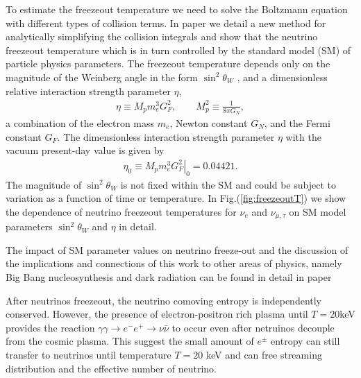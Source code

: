 \documentclass[Universe,article,submit,moreauthors,pdftex]{Definitions/mdpi}
\begin{document}
 To estimate the freezeout temperature we need to solve the Boltzmann equation with different types of collision terms. In paper\cite{Birrell:2014uka} we detail a new method for analytically simplifying the collision integrals and show that the neutrino freezeout temperature which is in turn controlled by the standard model (SM) of particle physics  parameters. The freezeout temperature depends only on the magnitude of the Weinberg angle in the form $\sin^2\theta_W$ , and a dimensionless relative interaction strength parameter $\eta$,
\begin{align}
\eta\equiv M_p m_e^3 G_F^2, \qquad M_p^2\equiv \frac{1}{8\pi G_N}, \end{align}
a combination of  the electron mass $m_e$, Newton constant $G_N$, and the Fermi constant $G_F$. The dimensionless interaction strength parameter $\eta$ with the vacuum present-day value is given by
\begin{align}
\eta_0\equiv \left.M_p m_e^3 G_F^2\right|_0  = 0.04421 .
\end{align}
The magnitude of  $\sin^2\theta_W$ is not fixed within the SM and  could be subject to variation as a function of time or temperature. In Fig.(\ref{fig:freezeoutT}) we show the dependence of neutrino freezeout temperatures for $\nu_e$ and $\nu_{\mu,\tau}$ on SM model parameters  $\sin^2\theta_W$ and $\eta$ in detail.

 The impact of SM parameter values on neutrino freeze-out and the discussion of the implications and connections of this work to other areas of physics, namely Big Bang nucleosynthesis and dark radiation can be found in detail in paper\cite{Birrell:2014uka}


 After neutrinos freezeout, the neutrino comoving entropy is independently conserved. However, the presence of electron-positron rich plasma until $T=20$keV provides the reaction $\gamma\gamma\to e^-e^+\to\nu\bar{\nu}$ to occur even after netruinos decouple from the cosmic plasma. This suggest the small amount of $e^\pm$ entropy can still transfer to neutrinos until temperature $T=20$ keV and can free streaming distribution and the effective number of neutrino. 
\end{document}
